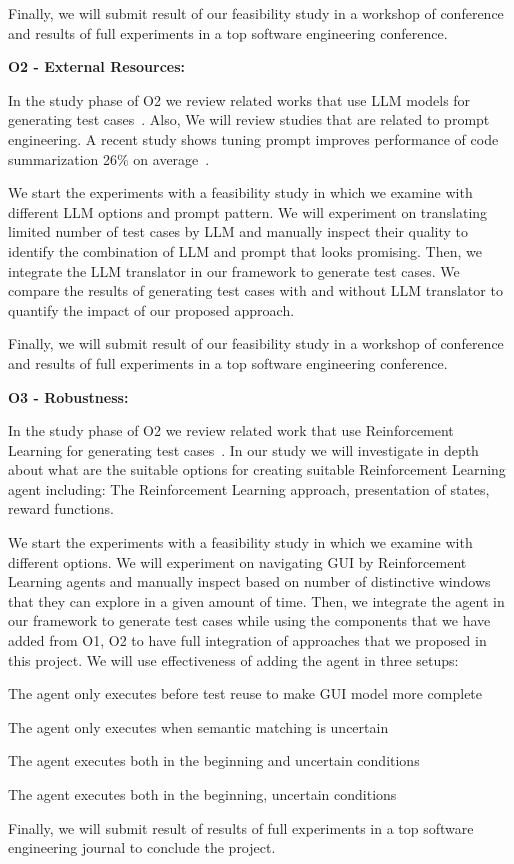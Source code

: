 \bigskip
Finally, we will submit result of our feasibility study in a workshop of conference and results of full experiments in a top software engineering conference. 



\bigskip
\noindent
\textbf{O2 - External Resources:}  

\bigskip
\noindent
In the study phase of O2 we review related works that use LLM models for generating test cases~\cite{Zimmermann:GPT3GUITest:2023:ICSTW, liu:GUIInputLLM:ICSE:2023}. 
Also, We will review studies that are related to prompt engineering.  
A recent study shows tuning prompt improves performance of code summarization  26\% on average~\cite{wang:prompt:FSE:2023}.

\bigskip
We start the experiments with a feasibility study in which we examine with different LLM options and prompt pattern. 
We will experiment on translating limited number of test cases by  LLM and manually inspect their quality to identify the  combination of LLM and prompt that looks promising. 
Then, we integrate the LLM translator in our framework to generate test cases.
We compare the results of generating test cases with and without LLM translator to quantify the impact of our proposed approach.

\bigskip
Finally, we will submit result of our feasibility study in a workshop of conference and results of full experiments in a top software engineering conference. 



\bigskip
\noindent
\textbf{O3 - Robustness:}  

\bigskip
\noindent
In the study phase of O2 we review related work that use Reinforcement Learning  for generating test cases~\cite{Mariani:GUI:STVR:2014,Vuong:RLTest:A-Test:2018,Pan:QTesting:ISSTA:2020,Romdhana:ARES:TOSEM:2022}. 
In our study we will investigate in depth about what are the suitable options for creating suitable  Reinforcement Learning  agent including: The Reinforcement Learning  approach,  presentation of states, reward functions. 

\bigskip
We start the experiments with a feasibility study in which we examine with different options. 
We will experiment on navigating GUI by Reinforcement Learning agents and manually inspect based on number of distinctive windows that they can explore in a given amount of time. 
Then, we integrate the agent in our framework to generate test cases while using the components that we have added from O1, O2 to have full integration of approaches that we proposed in this project. 
We will use effectiveness of adding the agent in three setups:
\begin{inparaenum}[a)]
	\item The agent only executes before test reuse to make GUI model more complete
	\item The agent only executes when semantic matching is uncertain
	\item The agent executes both in the beginning and uncertain conditions
	\item The agent executes both in the beginning, uncertain conditions
\end{inparaenum}

\bigskip
Finally, we will submit result of results of full experiments in a top software engineering journal to conclude the project. 




